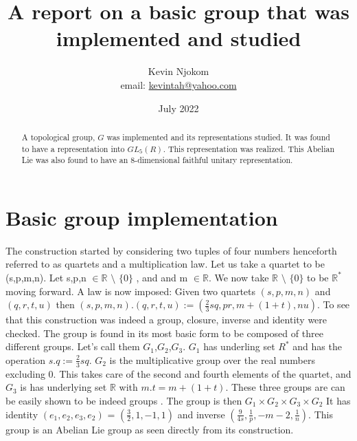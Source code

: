 \documentclass{article}
\title{A report on a basic group that was implemented and studied}
\author{Kevin Njokom\\ email: \href{mailto:kevintah@yahoo.com}{kevintah@yahoo.com} }
\date{July 2022}
\begin{document}
\maketitle

\begin{abstract}
   A topological group, $G$ was implemented and its representations studied. It was found to have a representation into $GL_5(R)$. This representation was realized. This Abelian Lie was also found to have an 8-dimensional faithful unitary representation.
\end{abstract}

\section{Basic group implementation}
     The construction started by  considering two tuples of four numbers henceforth referred to as  quartets and a multiplication law. Let us take a quartet to be (s,p,m,n). Let s,p,n $\in  \mathbb{R}$ $\setminus$ $\{0\}$ , and and m $\in \mathbb{R}$. We now take $\mathbb{R}$ $\setminus$ $\{0\}$ to be $\mathbb{R^*}$  moving forward. A law is now imposed: Given two quartets $(s,p,m,n)$ and $(q,r,t,u)$ then $(s,p,m,n).(q,r,t,u) := ( \frac{2}{3} sq, pr,m +(1+t),nu)$. To see that this construction was indeed a group, closure, inverse and identity were checked. The group is found in its most basic form to be composed of three different groups. Let's call them $G_1$,$G_2$,$G_3$.  $G_1$ has underling set $R^*$  and has the operation  $s.q := \frac{2}{3} sq$. $G_2$  is the multiplicative group over the real numbers excluding 0.  This takes care of the second and fourth elements of the quartet, and $G_3$ is has underlying set $\mathbb{R}$ with $m.t = m + (1+t)$. These three groups are can be easily shown to be indeed groups \cite{4498165}. The group is then $G_1 \times G_2 \times G_3 \times G_2$ It has identity $(e_1,e_2,e_3,e_2)$ = $(\frac{3}{2}, 1, -1,1)$ and  inverse $(\frac{9}{4s}, \frac{1}{p}, -m -2 , \frac{1}{n})$. This group is an Abelian Lie group as seen directly from its construction.
\end{document}

